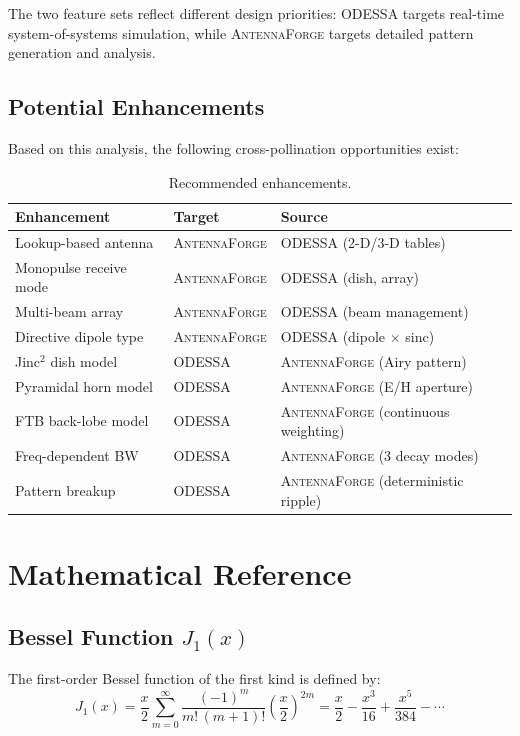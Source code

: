 \documentclass[11pt,a4paper]{article}
\newcommand{\AF}{\textsc{AntennaForge}}
\newcommand{\OD}{\textsc{ODESSA}}
\begin{document}
The two feature sets reflect different design priorities: \OD{} targets
real-time system-of-systems simulation, while \AF{} targets detailed
pattern generation and analysis.

\subsection{Potential Enhancements}

Based on this analysis, the following cross-pollination opportunities exist:

\begin{table}[H]
\centering
\caption{Recommended enhancements.}
\small
\begin{tabularx}{\textwidth}{l X X}
\toprule
\textbf{Enhancement} & \textbf{Target} & \textbf{Source} \\
\midrule
Lookup-based antenna & \AF{} & \OD{} (2-D/3-D tables) \\
Monopulse receive mode & \AF{} & \OD{} (dish, array) \\
Multi-beam array & \AF{} & \OD{} (beam management) \\
Directive dipole type & \AF{} & \OD{} (dipole $\times$ sinc) \\
Jinc$^2$ dish model & \OD{} & \AF{} (Airy pattern) \\
Pyramidal horn model & \OD{} & \AF{} (E/H aperture) \\
FTB back-lobe model & \OD{} & \AF{} (continuous weighting) \\
Freq-dependent BW & \OD{} & \AF{} (3 decay modes) \\
Pattern breakup & \OD{} & \AF{} (deterministic ripple) \\
\bottomrule
\end{tabularx}
\end{table}

\appendix
\section{Mathematical Reference}
\label{app:math}

\subsection{Bessel Function $J_1(x)$}

The first-order Bessel function of the first kind is defined by:
\begin{equation}
  J_1(x) = \frac{x}{2} \sum_{m=0}^{\infty}
    \frac{(-1)^m}{m!\,(m+1)!} \left(\frac{x}{2}\right)^{2m}
    = \frac{x}{2} - \frac{x^3}{16} + \frac{x^5}{384} - \cdots
\end{equation}
\end{document}
